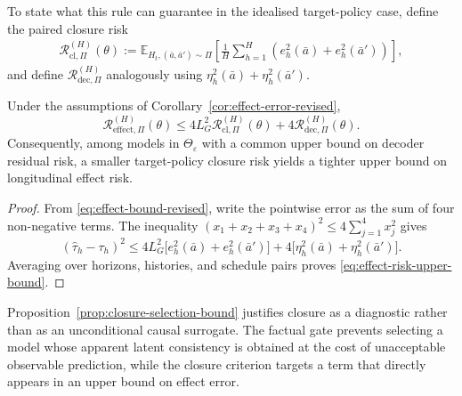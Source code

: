 To state what this rule can guarantee in the idealised target-policy
case, define the paired closure risk
\begin{equation}
\begin{split}
    \mathcal R_{\mathrm{cl},\Pi}^{(H)}(\theta)
    :=\mathbb E_{H_t,(\bar a,\bar a')\sim\Pi}
    \left[
      \frac1H\sum_{h=1}^{H}
      \left(e_h^2(\bar a)+e_h^2(\bar a')\right)
    \right],
\end{split}
    \label{eq:paired-closure-risk}
\end{equation}
and define $\mathcal R_{\mathrm{dec},\Pi}^{(H)}$ analogously using
$\eta_h^2(\bar a)+\eta_h^2(\bar a')$.

\begin{proposition}
\label{prop:closure-selection-bound}
Under the assumptions of Corollary~\ref{cor:effect-error-revised},
\begin{equation}
    \mathcal R_{\mathrm{effect},\Pi}^{(H)}(\theta)
    \leq
    4L_G^2\mathcal R_{\mathrm{cl},\Pi}^{(H)}(\theta)
    +4\mathcal R_{\mathrm{dec},\Pi}^{(H)}(\theta).
    \label{eq:effect-risk-upper-bound}
\end{equation}
Consequently, among models in $\Theta_\varepsilon$ with a common upper
bound on decoder residual risk, a smaller target-policy closure risk
yields a tighter upper bound on longitudinal effect risk.
\end{proposition}

\begin{proof}
From \eqref{eq:effect-bound-revised}, write the pointwise error as the
sum of four non-negative terms. The inequality
$(x_1+x_2+x_3+x_4)^2\leq4\sum_{j=1}^{4}x_j^2$ gives
\begin{equation}
    (\widehat\tau_h-\tau_h)^2
    \leq
    4L_G^2\bigl[e_h^2(\bar a)+e_h^2(\bar a')\bigr]
    +4\bigl[\eta_h^2(\bar a)+\eta_h^2(\bar a')\bigr].
\end{equation}
Averaging over horizons, histories, and schedule pairs proves
\eqref{eq:effect-risk-upper-bound}.
\end{proof}

Proposition~\ref{prop:closure-selection-bound} justifies closure as a
diagnostic rather than as an unconditional causal surrogate. The factual
gate prevents selecting a model whose apparent latent consistency is
obtained at the cost of unacceptable observable prediction, while the
closure criterion targets a term that directly appears in an upper bound
on effect error.

